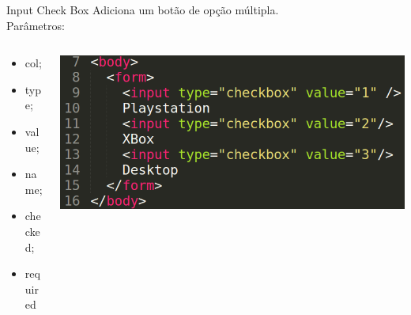 \documentclass{beamer}
\begin{document}
\begin{frame}{Input Check Box}
  Adiciona um botão de opção múltipla. \\Parâmetros:
    \begin{columns}
    \begin{column}{0.3 \textwidth}
      \small
     \begin{itemize}
       \item col;
        \item type;
        \item value;
        \item name;
        \item checked;
        \item required
     \end{itemize}
    \end{column}
    
    \begin{column}{0.6\textwidth}
     \includegraphics[height=0.35\paperheight]{fig/aula3/aula4_11.png}
    \end{column}
  \end{columns}
\end{frame}
\end{document}
